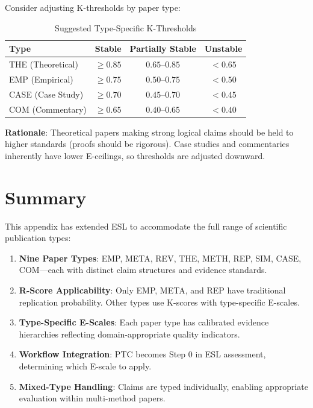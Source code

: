 \documentclass[11pt,a4paper]{article}
\begin{document}
Consider adjusting K-thresholds by paper type:

\begin{table}[h]
\centering
\caption{Suggested Type-Specific K-Thresholds}
\label{tab:thresholds}
\begin{tabular}{lccc}
\toprule
\textbf{Type} & \textbf{Stable} & \textbf{Partially Stable} & \textbf{Unstable} \\
\midrule
THE (Theoretical) & $\geq 0.85$ & $0.65$--$0.85$ & $< 0.65$ \\
EMP (Empirical) & $\geq 0.75$ & $0.50$--$0.75$ & $< 0.50$ \\
CASE (Case Study) & $\geq 0.70$ & $0.45$--$0.70$ & $< 0.45$ \\
COM (Commentary) & $\geq 0.65$ & $0.40$--$0.65$ & $< 0.40$ \\
\bottomrule
\end{tabular}
\end{table}

\textbf{Rationale}: Theoretical papers making strong logical claims should be held to higher standards (proofs should be rigorous). Case studies and commentaries inherently have lower E-ceilings, so thresholds are adjusted downward.


\section{Summary}
\label{sec:summary}

This appendix has extended ESL to accommodate the full range of scientific publication types:

\begin{enumerate}
    \item \textbf{Nine Paper Types}: EMP, META, REV, THE, METH, REP, SIM, CASE, COM---each with distinct claim structures and evidence standards.

    \item \textbf{R-Score Applicability}: Only EMP, META, and REP have traditional replication probability. Other types use K-scores with type-specific E-scales.

    \item \textbf{Type-Specific E-Scales}: Each paper type has calibrated evidence hierarchies reflecting domain-appropriate quality indicators.

    \item \textbf{Workflow Integration}: PTC becomes Step 0 in ESL assessment, determining which E-scale to apply.

    \item \textbf{Mixed-Type Handling}: Claims are typed individually, enabling appropriate evaluation within multi-method papers.
\end{enumerate}
\end{document}
